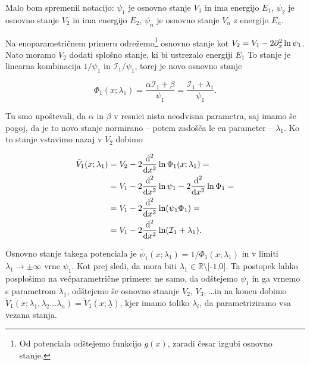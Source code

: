 Malo bom spremenil notacijo: $\psi_1$ je osnovno stanje $V_1$ in ima energijo $E_1$, $\psi_2$ je osnovno stanje $V_2$ in
ima energijo $E_2$, $\psi_n$ je osnovno stanje $V_n$ z energijo $E_n$.

Na enoparametri\v cnem primeru odre\v zemo\footnote{Od potenciala od\v stejemo funkcijo $g(x)$, zaradi \v cesar izgubi
osnovno stanje.} osnovno stanje kot $V_2 = V_1 - 2\px^2 \ln\psi_1$. Nato moramo $V_2$ dodati splo\v sno stanje, ki bi ustrezalo
energiji $E_1$ To stanje je linearna kombinacija $1/\psi_1$ in
$\mathcal{I}_1/\psi_1$, torej je novo osnovno stanje

\begin{equation}
	\Phi_1 (x;\lambda_1) = \frac{\alpha\mathcal{I}_1 + \beta}{\psi_1} = \frac{\mathcal{I}_1 + \lambda_1}{\psi_1}.
\end{equation}

\ni Tu smo upo\v stevali, da $\alpha$ in $\beta$ v resnici nista neodvisna parametra, saj imamo \v se pogoj, da je to novo stanje
normirano -- potem zado\v s\v ca le en parameter -- $\lambda_1$. Ko to stanje vstavimo nazaj v $V_2$ dobimo

\begin{align}
	\tilde{V}_1(x;\lambda_1) &= V_2 - 2\odv[2]\ln\Phi_1(x;\lambda_1) = \notag \\
		&= V_1 - 2\odv[2]\ln\psi_1 - 2\odv[2]\ln\Phi_1 = \notag \\
		&= V_1 - 2\odv[2]\ln (\psi_1 \Phi_1) = \notag \\
		&= V_1 - 2\odv[2]\ln (\mathcal{I}_1 + \lambda_1).
\end{align}

\ni Osnovno stanje takega potenciala je $\tilde{\psi_1}(x;\lambda_1) = 1/\Phi_1 (x;\lambda_1)$ in v limiti $\lambda_1 \to \pm
\infty$ vrne $\psi_1$. Kot prej sledi, da mora biti $\lambda_1 \in \mathbb{R}\text{\textbackslash [-1,0]}$. Ta postopek
lahko posplo\v simo na ve\v cparametri\v cne primere: ne samo, da od\v stejemo $\psi_1$ in ga vrnemo s parametrom $\lambda_1$,
od\v stejemo \v se osnovno stnanje $V_2$, $V_3$, \ldots in na koncu dobimo
$\tilde{V}_1 (x;\lambda_1,\lambda_2\ldots\lambda_n) = \tilde{V}_1 (x; \underline{\lambda})$, kjer imamo toliko $\lambda_i$, da
parametriziramo vsa vezana stanja.


